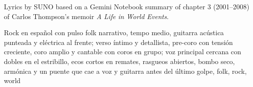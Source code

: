 
\begin{notes}
Lyrics by SUNO based on a Gemini Notebook summary of chapter 3 (2001--2008) of Carlos Thompson's memoir \emph{A Life in World Events}.
\end{notes}
\begin{style}
Rock en español con pulso folk narrativo, tempo medio, guitarra acústica punteada y eléctrica al frente; verso íntimo y detallista, pre-coro con tensión creciente, coro amplio y cantable con coros en grupo; voz principal cercana con dobles en el estribillo, ecos cortos en remates, rasgueos abiertos, bombo seco, armónica y un puente que cae a voz y guitarra antes del último golpe, folk, rock, world
\end{style}
